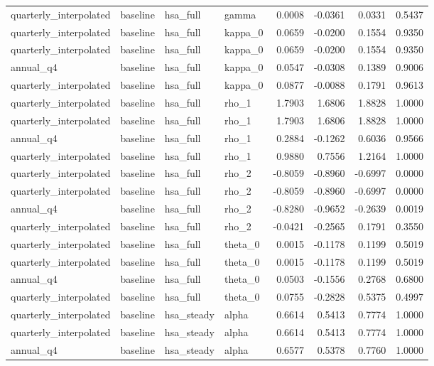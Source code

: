 \begin{tabular}{llllrrrr}
quarterly\_interpolated & baseline & hsa\_full & gamma & 0.0008 & -0.0361 & 0.0331 & 0.5437 \\
quarterly\_interpolated & baseline & hsa\_full & kappa\_0 & 0.0659 & -0.0200 & 0.1554 & 0.9350 \\
quarterly\_interpolated & baseline & hsa\_full & kappa\_0 & 0.0659 & -0.0200 & 0.1554 & 0.9350 \\
annual\_q4 & baseline & hsa\_full & kappa\_0 & 0.0547 & -0.0308 & 0.1389 & 0.9006 \\
quarterly\_interpolated & baseline & hsa\_full & kappa\_0 & 0.0877 & -0.0088 & 0.1791 & 0.9613 \\
quarterly\_interpolated & baseline & hsa\_full & rho\_1 & 1.7903 & 1.6806 & 1.8828 & 1.0000 \\
quarterly\_interpolated & baseline & hsa\_full & rho\_1 & 1.7903 & 1.6806 & 1.8828 & 1.0000 \\
annual\_q4 & baseline & hsa\_full & rho\_1 & 0.2884 & -0.1262 & 0.6036 & 0.9566 \\
quarterly\_interpolated & baseline & hsa\_full & rho\_1 & 0.9880 & 0.7556 & 1.2164 & 1.0000 \\
quarterly\_interpolated & baseline & hsa\_full & rho\_2 & -0.8059 & -0.8960 & -0.6997 & 0.0000 \\
quarterly\_interpolated & baseline & hsa\_full & rho\_2 & -0.8059 & -0.8960 & -0.6997 & 0.0000 \\
annual\_q4 & baseline & hsa\_full & rho\_2 & -0.8280 & -0.9652 & -0.2639 & 0.0019 \\
quarterly\_interpolated & baseline & hsa\_full & rho\_2 & -0.0421 & -0.2565 & 0.1791 & 0.3550 \\
quarterly\_interpolated & baseline & hsa\_full & theta\_0 & 0.0015 & -0.1178 & 0.1199 & 0.5019 \\
quarterly\_interpolated & baseline & hsa\_full & theta\_0 & 0.0015 & -0.1178 & 0.1199 & 0.5019 \\
annual\_q4 & baseline & hsa\_full & theta\_0 & 0.0503 & -0.1556 & 0.2768 & 0.6800 \\
quarterly\_interpolated & baseline & hsa\_full & theta\_0 & 0.0755 & -0.2828 & 0.5375 & 0.4997 \\
quarterly\_interpolated & baseline & hsa\_steady & alpha & 0.6614 & 0.5413 & 0.7774 & 1.0000 \\
quarterly\_interpolated & baseline & hsa\_steady & alpha & 0.6614 & 0.5413 & 0.7774 & 1.0000 \\
annual\_q4 & baseline & hsa\_steady & alpha & 0.6577 & 0.5378 & 0.7760 & 1.0000 \\

\end{tabular}
